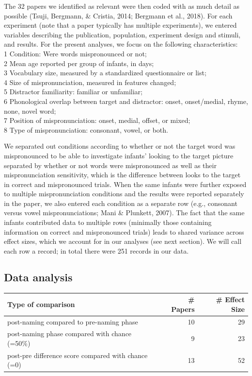 \documentclass[man]{apa6}
\theoremstyle{definition}
\theoremstyle{definition}
\theoremstyle{definition}
\theoremstyle{remark}
\begin{document}
The 32 papers we identified as relevant were then coded with as much
detail as possible (Tsuji, Bergmann, \& Cristia, 2014; Bergmann et al.,
2018). For each experiment (note that a paper typically has multiple
experiments), we entered variables describing the publication,
population, experiment design and stimuli, and results. For the present
analyses, we focus on the following characteristics:\\
1 Condition: Were words mispronounced or not;\\
2 Mean age reported per group of infants, in days;\\
3 Vocabulary size, measured by a standardized questionnaire or list;\\
4 Size of mispronunciation, measured in features changed;\\
5 Distractor familiarity: familiar or unfamiliar;\\
6 Phonological overlap between target and distractor: onset,
onset/medial, rhyme, none, novel word;\\
7 Position of mispronunciation: onset, medial, offset, or mixed;\\
8 Type of mispronunciation: consonant, vowel, or both.

We separated out conditions according to whether or not the target word
was mispronounced to be able to investigate infants' looking to the
target picture separated by whether or not words were mispronounced as
well as their mispronunciation sensitivity, which is the difference
between looks to the target in correct and mispronounced trials. When
the same infants were further exposed to multiple mispronunciation
conditions and the results were reported separately in the paper, we
also entered each condition as a separate row (e.g., consonant versus
vowel mispronunciations; Mani \& Plunkett, 2007). The fact that the same
infants contributed data to multiple rows (minimally those containing
information on correct and mispronounced trials) leads to shared
variance across effect sizes, which we account for in our analyses (see
next section). We will call each row a record; in total there were 251
records in our data.

\subsection{Data analysis}\label{data-analysis}

\begin{tabular}{l|r|r}
\hline
Type of comparison & \# Papers & \# Effect Size\\
\hline
post-naming compared to pre-naming phase & 10 & 29\\
\hline
post-naming phase compared with chance (=50\%) & 9 & 23\\
\hline
post-pre difference score compared with chance (=0) & 13 & 52\\
\hline
\end{tabular}
\end{document}
